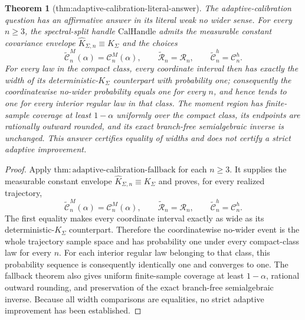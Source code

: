 \documentclass{article}
\newtheorem{theorem}{Theorem}
\begin{document}
\begin{theorem}[thm:adaptive-calibration-literal-answer]\label{thm:adaptive-calibration-literal-answer}
The adaptive-calibration question has an affirmative answer in its literal weak \emph{no wider} sense. For every \(n\geq3\), the spectral-split handle \(\mathrm{CalHandle}\) admits the measurable constant covariance envelope \(\widehat K_{\Sigma,n}\equiv K_\Sigma\) and the choices
\[
 \widetilde{\mathcal C}_n^M(\alpha)=\mathcal C_n^M(\alpha),
 \qquad
 \widetilde{\mathcal R}_n=\mathcal R_n,
 \qquad
 \widetilde{\mathcal C}_n^h=\mathcal C_n^h.
\]
For every law in the compact class, every coordinate interval then has exactly the width of its deterministic-\(K_\Sigma\) counterpart with probability one; consequently the coordinatewise no-wider probability equals one for every \(n\), and hence tends to one for every interior regular law in that class. The moment region has finite-sample coverage at least \(1-\alpha\) uniformly over the compact class, its endpoints are rationally outward rounded, and its exact branch-free semialgebraic inverse is unchanged. This answer certifies equality of widths and does not certify a strict adaptive improvement.
\end{theorem}
\begin{proof}
Apply \(\mathrm{thm{:}adaptive\mbox{-}calibration\mbox{-}fallback}\) for
each \(n\geq3\).  It supplies the measurable constant envelope
\(\widehat K_{\Sigma,n}\equiv K_\Sigma\) and proves, for every realized
trajectory,
\[
 \widetilde{\mathcal C}_n^M(\alpha)=\mathcal C_n^M(\alpha),
 \qquad
 \widetilde{\mathcal R}_n=\mathcal R_n,
 \qquad
 \widetilde{\mathcal C}_n^h=\mathcal C_n^h.
\]
The first equality makes every coordinate interval exactly as wide as its
deterministic-\(K_\Sigma\) counterpart.  Therefore the coordinatewise
no-wider event is the whole trajectory sample space and has probability one
under every compact-class law for every \(n\).  For each interior regular
law belonging to that class, this probability sequence is consequently
identically one and converges to one.  The fallback theorem also gives
uniform finite-sample coverage at least \(1-\alpha\), rational outward
rounding, and preservation of the exact branch-free semialgebraic inverse.
Because all width comparisons are equalities, no strict adaptive
improvement has been established.
\end{proof}
\end{document}
